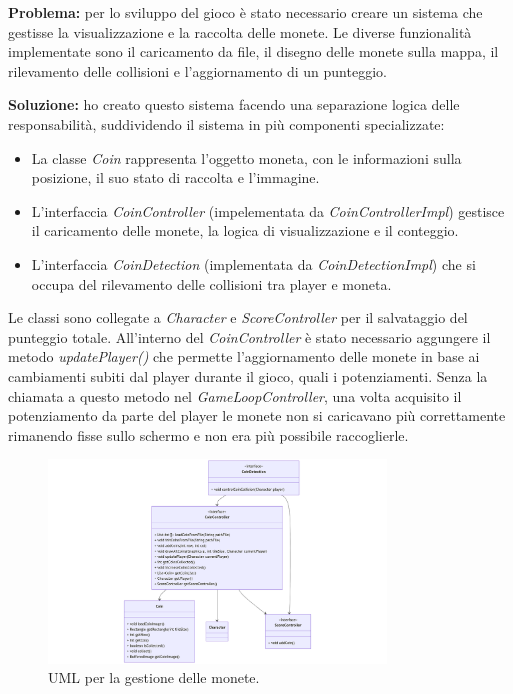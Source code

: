 \documentclass[a4paper,12pt]{report}
\begin{document}
\newpage
\textbf{Problema:} per lo sviluppo del gioco è stato necessario creare un sistema che gestisse la visualizzazione e la raccolta delle monete.
Le diverse funzionalità implementate sono il caricamento da file, il disegno delle monete sulla mappa, il rilevamento delle collisioni e 
l'aggiornamento di un punteggio.

\textbf{Soluzione:} ho creato questo sistema facendo una separazione logica delle responsabilità, suddividendo il sistema in più componenti
specializzate:
\begin{itemize}
    \item La classe \emph{Coin} rappresenta l'oggetto moneta, con le informazioni sulla posizione, il suo stato di raccolta e l'immagine.
    \item L'interfaccia \emph{CoinController} (impelementata da \emph{CoinControllerImpl}) gestisce il caricamento delle monete, la logica di 
    visualizzazione e il conteggio.
    \item L'interfaccia \emph{CoinDetection} (implementata da \emph{CoinDetectionImpl}) che si occupa del rilevamento delle collisioni tra player 
    e moneta.
\end{itemize}
Le classi sono collegate a \emph{Character} e \emph{ScoreController} per il salvataggio del punteggio totale.
All'interno del \emph{CoinController} è stato necessario aggungere il metodo \emph{updatePlayer()} che permette l'aggiornamento delle monete 
in base ai cambiamenti subiti dal player durante il gioco, quali i potenziamenti. Senza la chiamata a questo metodo nel \emph{GameLoopController}, 
una volta acquisito il potenziamento da parte del player le monete non si caricavano più correttamente rimanendo fisse sullo schermo e non era più
possibile raccoglierle.
\begin{figure}
    \centering
    \includegraphics[width=0.8\textwidth]{resources/UMLcoin.png}
    \caption{UML per la gestione delle monete.}
\end{figure}
\end{document}
